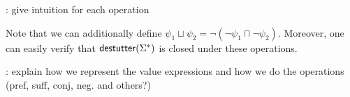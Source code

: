 \TODO: give intuition for each operation

Note that we can additionally define $\psi_1 \sqcup \psi_2 = \lnot (\lnot \psi_1 \sqcap \lnot \psi_2)$.
Moreover, one can easily verify that $\mathsf{destutter}(\Sigma^*)$ is closed under these operations.

\TODO: explain how we represent the value expressions and how we do the operations (pref, suff, conj, neg. and others?)







%
%
%
